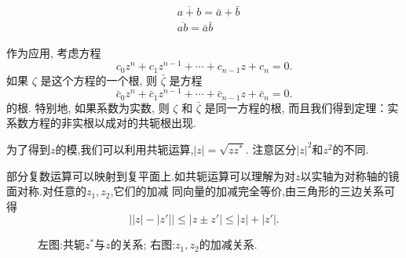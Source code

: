 \begin{equation}
    \begin{aligned}
    & \overline{a+b}=\bar{a}+\bar{b} \\
    & \overline{a b}=\bar{a} \bar{b}
    \end{aligned}
\end{equation}

作为应用, 考虑方程
$$
c_0 z^n+c_1 z^{n-1}+\cdots+c_{n-1} z+c_n=0 .
$$
如果 $\zeta$ 是这个方程的一个根, 则 $\bar{\zeta}$ 是方程
$$
\bar{c}_0 z^n+\bar{c}_1 z^{n-1}+\cdots+\bar{c}_{n-1} z+\bar{c}_n=0 .
$$
的根. 特别地, 如果系数为实数, 则 $\zeta$ 和 $\bar{\zeta}$ 是同一方程的根, 
而且我们得到定理：实系数方程的非实根以成对的共轭根出现.

为了得到$z$的模,我们可以利用共轭运算,$|z| = \sqrt{zz^{*}}$. 注意区分$|z|^2$和$z^2$的不同.

部分复数运算可以映射到复平面上.如共轭运算可以理解为对$z$以实轴为对称轴的镜面对称.对任意的$z_1,z_2$,它们的加减
同向量的加减完全等价,由三角形的三边关系可得
\begin{equation}
    \left| |z|- |z'| \right| \leq |z \pm z'| \leq |z| + |z'| .
\end{equation}
\begin{figure}[htb]
    \centering
    
\quad 
        
        \caption{左图:共轭$z^{*}$与$z$的关系; 右图:$z_1, z_2$的加减关系.}
\end{figure}
 

